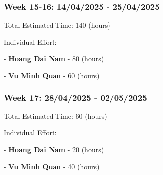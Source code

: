 \subsubsection*{Week 15-16: 14/04/2025 - 25/04/2025} 
Total Estimated Time: 140 (hours)

Individual Effort:

- \textbf{Hoang Dai Nam} - 80 (hours)

- \textbf{Vu Minh Quan} - 60 (hours)
\begin{table}[h]
\centering
{}
\caption{Task breakdown and effort allocation for week 15 and 16}
\end{table}

\subsubsection*{Week 17: 28/04/2025 - 02/05/2025} 
Total Estimated Time: 60 (hours)

Individual Effort:

- \textbf{Hoang Dai Nam} - 20 (hours)

- \textbf{Vu Minh Quan} - 40 (hours)
\begin{table}[h]
\centering
{}
\caption{Task breakdown and effort allocation for week 17}
\end{table}


